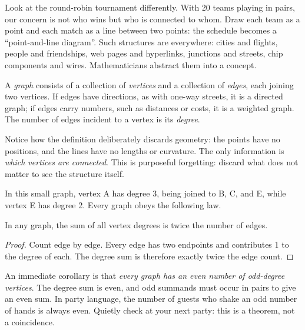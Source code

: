 Look at the round-robin tournament differently. With 20 teams playing in pairs, our concern is not who wins but who is connected to whom. Draw each team as a point and each match as a line between two points: the schedule becomes a ``point-and-line diagram''. Such structures are everywhere: cities and flights, people and friendships, web pages and hyperlinks, junctions and streets, chip components and wires. Mathematicians abstract them into a concept.

\begin{dingyi}[Graph]
A \emph{graph} consists of a collection of \emph{vertices} and a collection of \emph{edges}, each joining two vertices. If edges have directions, as with one-way streets, it is a directed graph; if edges carry numbers, such as distances or costs, it is a weighted graph. The number of edges incident to a vertex is its \emph{degree}.
\end{dingyi}

Notice how the definition deliberately discards geometry: the points have no positions, and the lines have no lengths or curvature. The only information is \emph{which vertices are connected}. This is purposeful forgetting: discard what does not matter to see the structure itself.

\begin{center}
\end{center}

In this small graph, vertex A has degree 3, being joined to B, C, and E, while vertex E has degree 2. Every graph obeys the following law.

\begin{dingli}
In any graph, the sum of all vertex degrees is twice the number of edges.
\end{dingli}

\begin{proof}
Count edge by edge. Every edge has two endpoints and contributes 1 to the degree of each. The degree sum is therefore exactly twice the edge count.
\end{proof}

An immediate corollary is that \emph{every graph has an even number of odd-degree vertices}. The degree sum is even, and odd summands must occur in pairs to give an even sum. In party language, the number of guests who shake an odd number of hands is always even. Quietly check at your next party: this is a theorem, not a coincidence.

